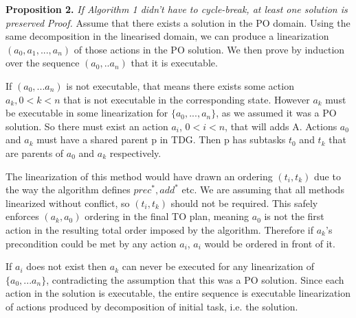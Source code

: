 \textbf{Proposition 2.} \textit{If Algorithm 1 didn't have to cycle-break, at least one solution is preserved} \newline
\textit{Proof.}
	Assume that there exists a solution in the PO domain. Using the same decomposition in the linearised domain, we can produce a linearization $(a_0, a_1, ..., a_n)$ of those actions in the PO solution. We then prove by induction over the sequence $(a_0, .. a_n)$ that it is executable.
 
	If $(a_0, ... a_n)$ is not executable, that means there exists some action $a_k,  0 < k < n$ that is not executable in the corresponding state.
	However $a_k$ must be executable in some linearization for $\{a_0, ..., a_n\}$, as we assumed it was a PO solution. So there must exist an action $a_i$, $0 < i < n$, that will adds A. Actions $a_0$ and $a_k$ must have a shared parent p in TDG. Then p has subtasks $t_0$ and $t_k$ that are parents of $a_0$ and $a_k$ respectively. 
	
	The linearization of this method would have drawn an ordering $(t_i, t_k)$ due to the way the algorithm defines $prec^{*}, add^{*}$ etc. We are assuming that all methods linearized without conflict, so $(t_i, t_k)$ should not be required. This safely enforces $(a_k, a_0)$ ordering in the final TO plan, meaning $a_0$ is not the first action in the resulting total order imposed by the algorithm. Therefore if $a_k$’s precondition could be met by any action $a_i$, $a_i$ would be ordered in front of it. 
	
	If $a_i$ does not exist then $a_k$ can never be executed for any linearization of $\{a_0, ...a_n\}$, contradicting the assumption that this was a PO solution. Since each action in the solution is executable, the entire sequence is executable linearization of actions produced by decomposition of initial task, i.e. the solution.
	

